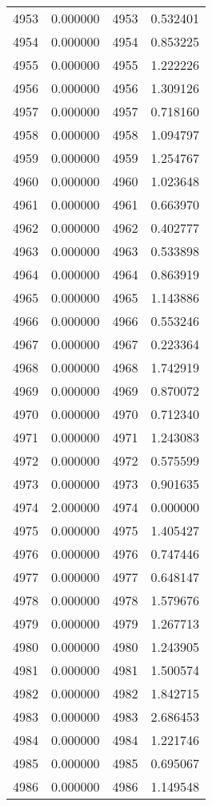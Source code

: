 \documentclass[12pt]{article}
\begin{document}
\begin{longtable}{@{}cccc@{}}
4953 & 0.000000 & 4953 & 0.532401 \\
4954 & 0.000000 & 4954 & 0.853225 \\
4955 & 0.000000 & 4955 & 1.222226 \\
4956 & 0.000000 & 4956 & 1.309126 \\
4957 & 0.000000 & 4957 & 0.718160 \\
4958 & 0.000000 & 4958 & 1.094797 \\
4959 & 0.000000 & 4959 & 1.254767 \\
4960 & 0.000000 & 4960 & 1.023648 \\
4961 & 0.000000 & 4961 & 0.663970 \\
4962 & 0.000000 & 4962 & 0.402777 \\
4963 & 0.000000 & 4963 & 0.533898 \\
4964 & 0.000000 & 4964 & 0.863919 \\
4965 & 0.000000 & 4965 & 1.143886 \\
4966 & 0.000000 & 4966 & 0.553246 \\
4967 & 0.000000 & 4967 & 0.223364 \\
4968 & 0.000000 & 4968 & 1.742919 \\
4969 & 0.000000 & 4969 & 0.870072 \\
4970 & 0.000000 & 4970 & 0.712340 \\
4971 & 0.000000 & 4971 & 1.243083 \\
4972 & 0.000000 & 4972 & 0.575599 \\
4973 & 0.000000 & 4973 & 0.901635 \\
4974 & 2.000000 & 4974 & 0.000000 \\
4975 & 0.000000 & 4975 & 1.405427 \\
4976 & 0.000000 & 4976 & 0.747446 \\
4977 & 0.000000 & 4977 & 0.648147 \\
4978 & 0.000000 & 4978 & 1.579676 \\
4979 & 0.000000 & 4979 & 1.267713 \\
4980 & 0.000000 & 4980 & 1.243905 \\
4981 & 0.000000 & 4981 & 1.500574 \\
4982 & 0.000000 & 4982 & 1.842715 \\
4983 & 0.000000 & 4983 & 2.686453 \\
4984 & 0.000000 & 4984 & 1.221746 \\
4985 & 0.000000 & 4985 & 0.695067 \\
4986 & 0.000000 & 4986 & 1.149548 \\

\end{longtable}
\end{document}
